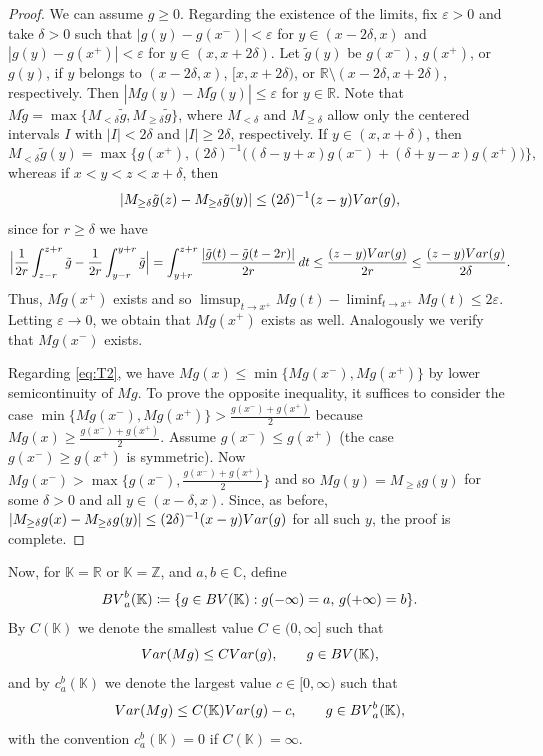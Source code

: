 \documentclass[leqno,11pt]{amsart}
\numberwithin{equation}{section}
\numberwithin{theorem}{section}
\newcommand{\KK}{\mathbb{K}}
\newcommand{\RR}{\mathbb{R}}
\newcommand{\ZZ}{\mathbb{Z}}
\newcommand{\CC}{\mathbb{C}}
\newcommand{\Var}{{\rm Var}}
\newcommand{\BV}{{\rm BV}}
\begin{document}
	\begin{proof}
	We can assume $g \geq 0$. Regarding the existence of the limits, fix $\varepsilon > 0$ and take $\delta > 0$ such that $|g(y) - g(x^-)| < \varepsilon$ for $y \in (x- 2 \delta, x)$ and $|g(y) - g(x^+)|  < \varepsilon$ for $y \in (x, x + 2 \delta)$. Let
	$\tilde g(y)$ be $g(x^-)$, $g(x^+)$, or $g(y)$, if $y$ belongs to $(x-2\delta, x)$, $[x, x+2\delta)$, or $\RR\setminus (x-2\delta, x+2\delta)$, respectively. Then $|Mg(y) - M\tilde g(y)| \leq \varepsilon$ for $y \in \RR$. Note that $M \tilde g = \max\{M_{< \delta} \tilde g, M_{\geq \delta} \tilde g\}$, where $M_{< \delta}$ and $M_{\geq \delta}$ allow only the centered intervals $I$ with $|I| < 2 \delta$ and $|I| \geq 2 \delta$, respectively. If $y \in (x, x+\delta)$, then 
	\[
	M_{<\delta} \tilde g(y) = \max \big\{ g(x^+), (2\delta)^{-1} \big((\delta - y+x)g(x^-) + (\delta + y - x)g(x^+) \big)  \big\},
	\]
	whereas if $x < y < z < x+\delta$, then 
	\[
	|M_{\geq \delta} \tilde g(z) - M_{\geq \delta} \tilde g(y)| \leq (2\delta)^{-1} (z-y)\Var(g),
	\] 
	since for $r \geq \delta$ we have
	\begin{align*}
	\Big| \frac{1}{2r} \int_{z-r}^{z+r} \tilde g - \frac{1}{2r} \int_{y-r}^{y+r} \tilde g \Big|
	=\int_{y+r}^{z+r}\frac{|\tilde g(t)- \tilde g(t-2r)|}{2r} \,dt \leq \frac{(z-y) \Var(g)}{2r}
	\leq \frac{(z-y)\Var(g)}{2 \delta}.
	\end{align*}  
	Thus, $M \tilde g(x^+)$ exists and so $\limsup_{t \to x^+} Mg(t) - \liminf_{t \to x^+} Mg(t) \leq 2 \varepsilon$. Letting $\varepsilon \to 0$, we obtain that $Mg(x^+)$ exists as well. Analogously we verify that $Mg(x^-)$ exists.
	
	Regarding \eqref{eq:T2}, we have $Mg(x) \leq \min \{ Mg(x^-), Mg(x^+) \}$ by lower semicontinuity of $Mg$. To prove the opposite inequality, it suffices to consider the case
	$\min \{ Mg(x^-), Mg(x^+) \} > \frac{g(x^-) + g(x^+)}{2}$ because 
	$
	Mg(x) \geq \frac{g(x^-) + g(x^+)}{2}.
	$ 
	Assume $g(x^-) \leq g(x^+)$ (the case $g(x^-) \geq  g(x^+)$ is symmetric). Now 
	$Mg(x^-) > \max \{ g(x^-), \frac{g(x^-) + g(x^+)}{2} \}$ and so $Mg(y) = M_{\geq \delta} g(y)$ for some $\delta > 0$ and all $y \in (x-\delta, x)$. Since, as before, 
	$|M_{\geq \delta} g(x) - M_{\geq \delta} g(y)| \leq (2 \delta)^{-1} (x-y) \Var(g)$ for all such $y$, 
	the proof is complete.
	\end{proof}
	
	Now, for $\KK=\RR$ or $\KK=\ZZ$, and  $a,b \in \CC$, define
	\[
	\BV_a^b(\KK) \coloneqq \{g \in \BV(\KK) : g(-\infty) = a, \, g(+\infty) = b \}.
	\]
	By $C(\KK)$ we denote the smallest value $C \in (0,\infty]$ such that
	\[
	\Var (Mg) \leq C \Var (g), \qquad g \in \BV(\KK),
	\]
	and by $c_a^b(\KK)$ we denote the largest value $c \in [0,\infty)$ such that
	\[
	\Var (Mg) \leq C(\KK) \Var (g) - c, \qquad g \in \BV_a^b(\KK),
	\]
	with the convention $c_a^b(\KK) = 0$ if $C(\KK) = \infty$. 
	
\end{document}

